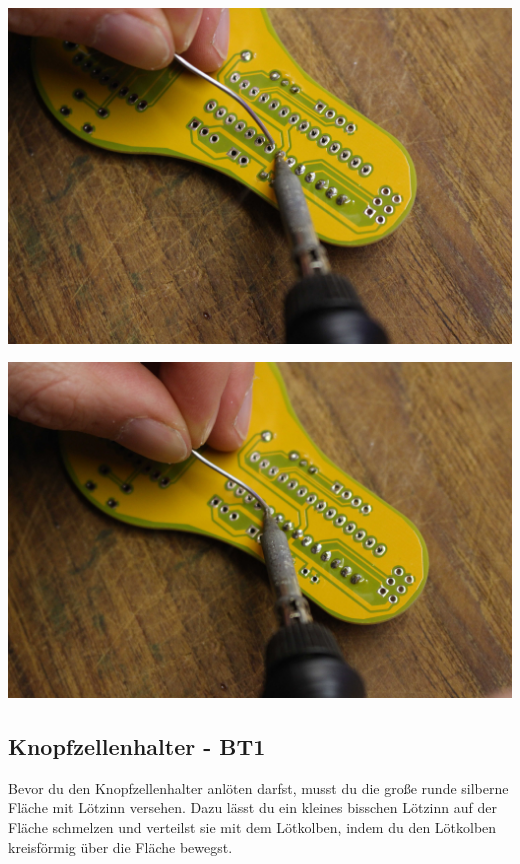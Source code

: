 \documentclass{article}
\begin{document}
\begin{minipage}[b]{0.5\textwidth}
	\includegraphics[width=\textwidth]{Bilder/IMG_5559.JPG}
\end{minipage}
\begin{minipage}[b]{0.5\textwidth}
	\includegraphics[width=\textwidth]{Bilder/IMG_5560.JPG}
\end{minipage}

\subsection{Knopfzellenhalter - BT1}

Bevor du den Knopfzellenhalter anlöten darfst, musst du die große runde silberne Fläche mit Lötzinn versehen. Dazu lässt du ein kleines bisschen Lötzinn auf der Fläche schmelzen und verteilst sie mit dem Lötkolben, indem du den Lötkolben kreisförmig über die Fläche bewegst.
\end{document}
